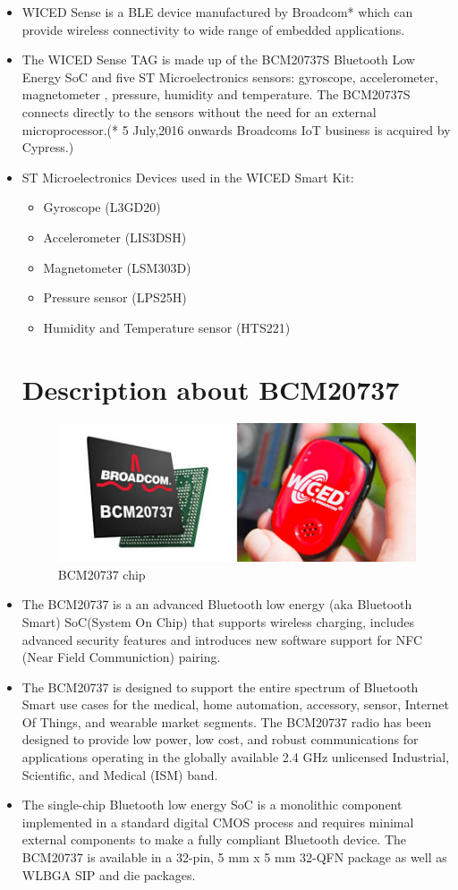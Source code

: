 \documentclass[11pt,a4paper]{article}
\begin{document}
\begin{itemize}
\item WICED Sense is a BLE device manufactured by Broadcom* which can provide wireless connectivity to wide range of embedded applications.
\item The WICED Sense TAG is made up of the BCM20737S Bluetooth Low Energy SoC and five ST Microelectronics sensors: gyroscope, accelerometer, magnetometer , pressure, humidity and temperature. The BCM20737S connects directly to the sensors without the need for an external microprocessor.(* 5 July,2016 onwards Broadcoms IoT business is acquired by Cypress.)
\item ST Microelectronics Devices used in the WICED Smart Kit:
\begin{itemize}
\item Gyroscope (L3GD20)
\item Accelerometer (LIS3DSH)
\item Magnetometer (LSM303D)
\item Pressure sensor (LPS25H)
\item Humidity and Temperature sensor (HTS221)
\end{itemize}


\newpage
\section{Description about BCM20737}

\begin{figure}[h]
    \centering
	\includegraphics[scale=0.5]{BCM20737.jpg}
		\caption{BCM20737 chip}
	\end{figure}



\item The BCM20737 is a an advanced Bluetooth low energy (aka Bluetooth Smart) 
SoC(System On Chip) that supports wireless charging, includes advanced security features and introduces new software support for NFC (Near Field Communiction) pairing. 
\item The BCM20737 is designed to support the entire spectrum of Bluetooth Smart use cases for the medical, home automation, accessory, sensor, Internet Of Things, and wearable market
segments. The BCM20737 radio has been designed to provide
low power, low cost, and robust communications for applications operating in the globally available
2.4 GHz unlicensed Industrial, Scientific, and Medical
(ISM) band.
\item The single-chip Bluetooth low energy SoC is a
monolithic component implemented in a standard
digital CMOS process and requires minimal external
components to make a fully compliant Bluetooth
device. The BCM20737 is available in a 32-pin,
5 mm x 5 mm 32-QFN package as well as WLBGA
SIP and die packages.


\end{itemize}
\end{document}
